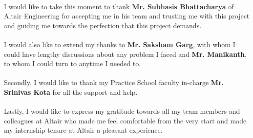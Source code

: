 

\paragraph{}
I would like to take this moment to thank \textbf{Mr. Subhasis Bhattacharya} of
Altair Engineering for accepting me in his team and trusting me with this
project and guiding me towards the perfection that this project demands.

\paragraph{}
I would also like to extend my thanks to \textbf{Mr. Saksham Garg}, with whom I
could have lengthy discussions about any problem I faced and
\textbf{Mr. Manikanth}, to whom I could turn to anytime I needed to.

\paragraph{}
Secondly, I would like to thank my Practice School faculty in-charge
\textbf{Mr. Srinivas Kota} for all the support and help.

\paragraph{}
Lastly, I would like to express my gratitude towards all my team members and
colleagues at Altair who made me feel comfortable from the very start and made
my internship tenure at Altair a pleasant experience.
